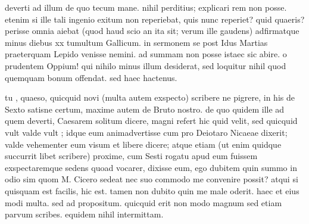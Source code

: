


 deverti ad illum de quo tecum mane. nihil perditius; explicari rem non posse. etenim si ille tali ingenio exitum non reperiebat, quis nunc reperiet? quid quaeris? perisse omnia aiebat (quod haud scio an ita sit; verum ille gaudens) adfirmatque minus diebus xx tumultum Gallicum. in sermonem se post Idus Martias praeterquam Lepido venisse nemini. ad summam non posse istaec sic abire. o prudentem Oppium! qui nihilo minus illum desiderat, sed loquitur nihil quod quemquam bonum offendat. sed haec hactenus.

 tu , quaeso, quicquid novi (multa autem exspecto) scribere ne pigrere, in his de Sexto satisne certum, maxime autem de Bruto nostro. de quo quidem ille ad quem deverti, Caesarem solitum dicere, magni refert hic quid velit, sed quicquid vult valde vult ; idque eum animadvertisse cum pro Deiotaro Nicaeae dixerit; valde vehementer eum visum et libere dicere; atque etiam (ut enim quidque succurrit libet scribere) proxime, cum Sesti rogatu apud eum fuissem exspectaremque sedens quoad vocarer, dixisse eum, ego dubitem quin summo in odio sim quom M. Cicero sedeat nec suo commodo me convenire possit? atqui si quisquam est facilis, hic est. tamen non dubito quin me male oderit. haec et eius modi multa. sed ad propositum. quicquid erit non modo magnum sed etiam parvum scribes. equidem nihil intermittam.
